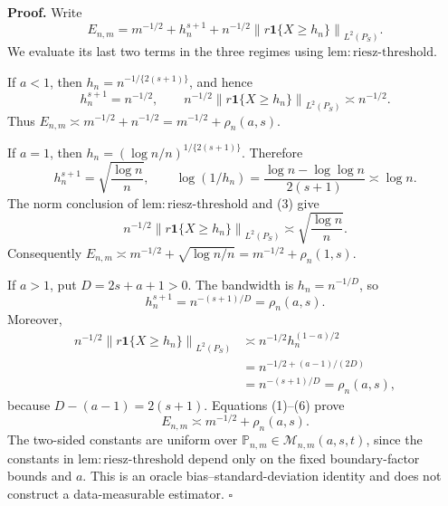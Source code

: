 \textbf{Proof.}
Write
\[
E_{n,m}=m^{-1/2}+h_n^{s+1}
+n^{-1/2}\left\|r\mathbf 1\{X\ge h_n\}\right\|_{L^2(P_S)}.
\tag{1}
\]
We evaluate its last two terms in the three regimes using \(\mathrm{lem:riesz\text{-}threshold}\).

If \(a<1\), then \(h_n=n^{-1/\{2(s+1)\}}\), and hence
\[
h_n^{s+1}=n^{-1/2},
\qquad
n^{-1/2}\left\|r\mathbf 1\{X\ge h_n\}\right\|_{L^2(P_S)}\asymp n^{-1/2}.
\tag{2}
\]
Thus \(E_{n,m}\asymp m^{-1/2}+n^{-1/2}=m^{-1/2}+\rho_n(a,s)\).

If \(a=1\), then \(h_n=(\log n/n)^{1/\{2(s+1)\}}\). Therefore
\[
h_n^{s+1}=\sqrt{\frac{\log n}{n}},
\qquad
\log(1/h_n)=\frac{\log n-\log\log n}{2(s+1)}\asymp\log n.
\tag{3}
\]
The norm conclusion of \(\mathrm{lem:riesz\text{-}threshold}\) and (3) give
\[
n^{-1/2}\left\|r\mathbf 1\{X\ge h_n\}\right\|_{L^2(P_S)}
\asymp\sqrt{\frac{\log n}{n}}.
\tag{4}
\]
Consequently \(E_{n,m}\asymp m^{-1/2}+\sqrt{\log n/n}=m^{-1/2}+\rho_n(1,s)\).

If \(a>1\), put \(D=2s+a+1>0\). The bandwidth is \(h_n=n^{-1/D}\), so
\[
h_n^{s+1}=n^{-(s+1)/D}=\rho_n(a,s).
\tag{5}
\]
Moreover,
\[
\begin{aligned}
n^{-1/2}\left\|r\mathbf 1\{X\ge h_n\}\right\|_{L^2(P_S)}
&\asymp n^{-1/2}h_n^{(1-a)/2}\\
&=n^{-1/2+(a-1)/(2D)}\\
&=n^{-(s+1)/D}=\rho_n(a,s),
\end{aligned}
\tag{6}
\]
because \(D-(a-1)=2(s+1)\). Equations (1)--(6) prove
\[
E_{n,m}\asymp m^{-1/2}+\rho_n(a,s).
\]
The two-sided constants are uniform over \(\mathbb P_{n,m}\in\mathcal M_{n,m}(a,s,t)\), since the constants in \(\mathrm{lem:riesz\text{-}threshold}\) depend only on the fixed boundary-factor bounds and \(a\). This is an oracle bias--standard-deviation identity and does not construct a data-measurable estimator. \(\square\)